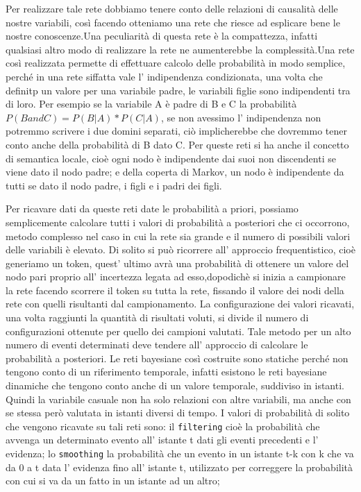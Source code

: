 		Per realizzare tale rete dobbiamo tenere conto delle relazioni di causalità delle nostre variabili, così facendo otteniamo una rete che riesce ad esplicare bene le nostre conoscenze.Una peculiarità di questa rete è la compattezza, infatti qualsiasi altro modo di realizzare la rete ne aumenterebbe la complessità.Una rete così realizzata permette di effettuare calcolo delle probabilità in modo semplice, perché  in una rete siffatta vale l' indipendenza condizionata, una volta che definitp un valore per una variabile padre, le variabili figlie sono indipendenti tra di loro. Per esempio se la variabile A è padre di B e C la probabilità $P(B and C)=P(B|A)*P(C|A)$, se non avessimo l' indipendenza non potremmo scrivere i due domini separati, ciò implicherebbe che dovremmo tener conto anche della probabilità di B dato C. Per queste reti si ha anche il concetto di semantica locale, cioè ogni nodo è indipendente dai suoi non discendenti se viene dato il nodo padre; e della coperta di Markov, un nodo è indipendente da tutti se dato il nodo padre, i figli e i padri dei figli.
		\par  
		Per ricavare dati da queste reti date le probabilità a priori, possiamo semplicemente calcolare tutti i valori di probabilità a posteriori che ci occorrono, metodo complesso nel caso in cui la rete sia grande e il numero di possibili valori delle variabili è elevato. Di solito si può ricorrere all' approccio frequentistico, cioè generiamo un token, quest' ultimo avrà una probabilità di ottenere un valore del nodo pari proprio all' incertezza legata ad esso,dopodichè si inizia a campionare la rete facendo scorrere il token su tutta la rete, fissando il valore dei nodi della rete con quelli risultanti dal campionamento. La configurazione dei valori ricavati, una volta raggiunti la quantità di risultati voluti, si divide il numero di configurazioni ottenute per quello dei campioni valutati. Tale metodo per un alto numero di eventi determinati deve tendere all' approccio di calcolare le probabilità a posteriori. Le reti bayesiane così costruite sono statiche perché non tengono conto di un riferimento temporale, infatti esistono le reti bayesiane dinamiche che tengono conto anche di un valore temporale, suddiviso in istanti. Quindi la variabile casuale non ha solo relazioni con altre variabili, ma anche con se stessa però valutata in istanti diversi di tempo. I valori di probabilità di solito che vengono ricavate su tali reti sono: il \texttt{filtering} cioè la probabilità che avvenga un determinato evento all' istante t dati gli eventi precedenti e l' evidenza; lo \texttt{smoothing} la probabilità che un evento in un istante t-k con k che va da 0 a t data l' evidenza fino all' istante t, utilizzato per correggere la probabilità con cui si va da un fatto in un istante ad un altro;
